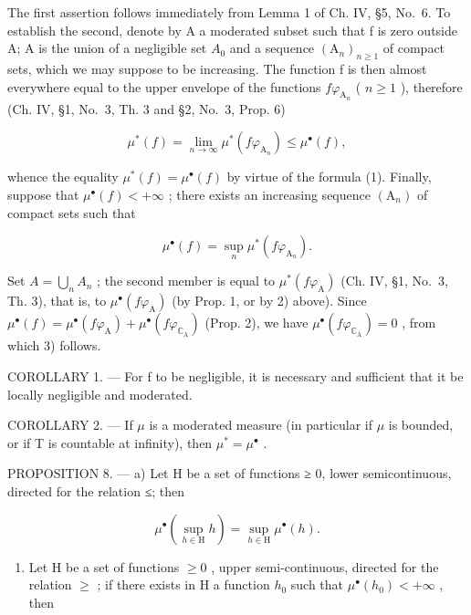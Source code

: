 The first assertion follows immediately from Lemma 1 of Ch. IV, §5, No.~6. To establish the second, denote by A a moderated subset such that f is zero outside A; A is the union of a negligible set \(A_{0}\) and a sequence \((\mathrm{A}_{n})_{n\geqslant1}\) of compact sets, which we may suppose to be increasing. The function f is then almost everywhere equal to the upper envelope of the functions \(f\varphi_{\mathrm{A}_{n}}\) ( \(n\geqslant1\) ), therefore (Ch. IV, §1, No.~3, Th. 3 and §2, No.~3, Prop. 6)

\[
\mu^ {*} (f) = \lim _ {n \rightarrow \infty} \mu^ {*} (f \varphi_ {\mathrm{A} _ {n}}) \leqslant \mu^ {\bullet} (f),
\]

whence the equality \(\mu^{*}(f)=\mu^{\bullet}(f)\) by virtue of the formula (1). Finally, suppose that \(\mu^{\bullet}(f)<+\infty\) ; there exists an increasing sequence \((\mathrm{A}_{n})\) of compact sets such that

\[
\mu^ {\bullet} (f) = \sup _ {n} \mu^ {*} (f \varphi_ {\mathrm{A} _ {n}}).
\]

Set \(A = \bigcup_{n} A_{n}\) ; the second member is equal to \(\mu^{*}(f\varphi_{\mathrm{A}})\) (Ch. IV, §1, No.~3, Th. 3), that is, to \(\mu^{\bullet}(f\varphi_{\mathrm{A}})\) (by Prop. 1, or by 2) above). Since \(\mu^{\bullet}(f) = \mu^{\bullet}(f\varphi_{\mathrm{A}}) + \mu^{\bullet}(f\varphi_{\mathbb{C}_{\mathrm{A}}})\) (Prop. 2), we have \(\mu^{\bullet}(f\varphi_{\mathbb{C}_{\mathrm{A}}}) = 0\) , from which 3) follows.

COROLLARY 1. --- For f to be negligible, it is necessary and sufficient that it be locally negligible and moderated.

COROLLARY 2. --- If \(\mu\) is a moderated measure (in particular if \(\mu\) is bounded, or if T is countable at infinity), then \(\mu^{*} = \mu^{\bullet}\) .

PROPOSITION 8. --- a) Let H be a set of functions ≥ 0, lower semicontinuous, directed for the relation ≤; then

\[
\mu^ {\bullet} \left(\sup _ {h \in \mathrm{H}} h\right) = \sup _ {h \in \mathrm{H}} \mu^ {\bullet} (h).
\]

\begin{enumerate}
\def\labelenumi{\alph{enumi})}
\setcounter{enumi}{1}
\tightlist
\item
  Let H be a set of functions \(\geqslant0\) , upper semi-continuous, directed for the relation \(\geqslant\) ; if there exists in H a function \(h_{0}\) such that \(\mu^{\bullet}(h_{0})<+\infty\) , then
\end{enumerate}

